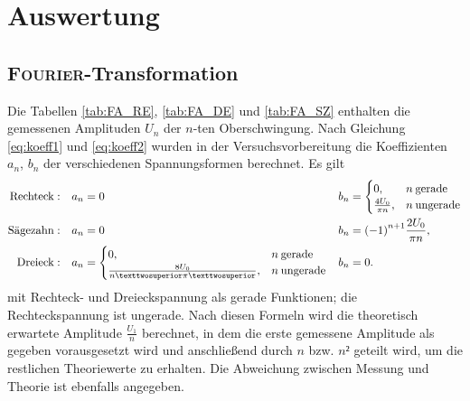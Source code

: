 \section{Auswertung}
\label{sec:Auswertung}
\subsection{\textsc{Fourier}-Transformation}
\label{sec:FT}
Die Tabellen \ref{tab:FA_RE}, \ref{tab:FA_DE} und \ref{tab:FA_SZ} enthalten die gemessenen Amplituden ${U_n}$ der $n$-ten Oberschwingung. 
Nach Gleichung \eqref{eq:koeff1} und \eqref{eq:koeff2} wurden in der Versuchsvorbereitung die Koeffizienten $a_n$, $b_n$ der verschiedenen Spannungsformen berechnet. 
Es gilt
\begin{align}
	\centering 
	\text{Rechteck}:\quad &a_n=0 & b_n&=
\begin{cases}
0, & n \:\text{gerade} \\
\frac{4 U_0}{\pi n}, & n\: \text{ungerade}
\end{cases}
	\label{koeff1}
	\\
	\text{Sägezahn}:\quad &a_n=0 & b_n&={(-1)}^{n+1}\frac{2U_0}{\pi n},
	\label{koeff2}\\
	\text{Dreieck}: \quad &a_n=
\begin{cases}
0, & n \:\text{gerade} \\
\frac{8U_0}{n²\pi²}, & n \:\text{ungerade}
\end{cases}
& b_n&=0.
	\label{koeff3}
\end{align}
mit Rechteck- und Dreieckspannung als gerade Funktionen; die Rechteckspannung ist ungerade.
Nach diesen Formeln wird die theoretisch erwartete Amplitude $\frac{U_1}{n}$ berechnet, in dem die erste gemessene Amplitude als gegeben vorausgesetzt wird und anschließend durch $n$ bzw. $n²$ geteilt wird, um die restlichen Theoriewerte zu erhalten. Die Abweichung zwischen Messung und Theorie ist ebenfalls angegeben.

